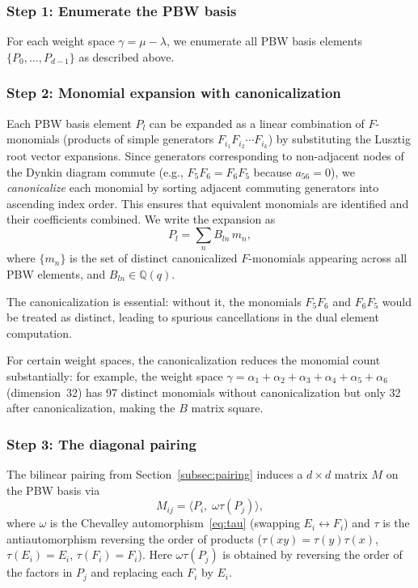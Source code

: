 \documentclass{ximera}
\begin{document}
\subsubsection*{Step 1: Enumerate the PBW basis}

For each weight space $\gamma = \mu - \lambda$, we enumerate all PBW basis elements $\{P_0, \ldots, P_{d-1}\}$ as described above.

\subsubsection*{Step 2: Monomial expansion with canonicalization}

Each PBW basis element $P_l$ can be expanded as a linear combination of $F$-monomials (products of simple generators $F_{i_1} F_{i_2} \cdots F_{i_k}$) by substituting the Lusztig root vector expansions. Since generators corresponding to non-adjacent nodes of the Dynkin diagram commute (e.g., $F_5 F_6 = F_6 F_5$ because $a_{56} = 0$), we \emph{canonicalize} each monomial by sorting adjacent commuting generators into ascending index order. This ensures that equivalent monomials are identified and their coefficients combined. We write the expansion as
\begin{equation}\label{eq:B-expansion}
    P_l = \sum_{n} B_{ln}\, m_n,
\end{equation}
where $\{m_n\}$ is the set of distinct canonicalized $F$-monomials appearing across all PBW elements, and $B_{ln} \in \mathbb{Q}(q)$.

The canonicalization is essential: without it, the monomials $F_5 F_6$ and $F_6 F_5$ would be treated as distinct, leading to spurious cancellations in the dual element computation.

\begin{remark}
For certain weight spaces, the canonicalization reduces the monomial count substantially: for example, the weight space $\gamma = \alpha_1 + \alpha_2 + \alpha_3 + \alpha_4 + \alpha_5 + \alpha_6$ (dimension~32) has 97 distinct monomials without canonicalization but only 32 after canonicalization, making the $B$ matrix square.
\end{remark}

\subsubsection*{Step 3: The diagonal pairing}

The bilinear pairing from Section~\ref{subsec:pairing} induces a $d \times d$ matrix $M$ on the PBW basis via
\[
    M_{ij} = \langle P_i,\; \omega\tau(P_j) \rangle,
\]
where $\omega$ is the Chevalley automorphism~\eqref{eq:tau} (swapping $E_i \leftrightarrow F_i$) and $\tau$ is the antiautomorphism reversing the order of products ($\tau(xy) = \tau(y)\tau(x)$, $\tau(E_i) = E_i$, $\tau(F_i) = F_i$). Here $\omega\tau(P_j)$ is obtained by reversing the order of the factors in $P_j$ and replacing each $F_i$ by $E_i$.
\end{document}
